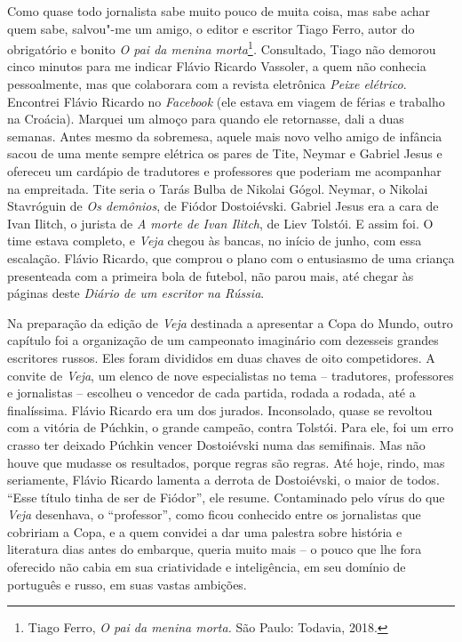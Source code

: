 Como quase todo jornalista sabe muito pouco de muita coisa, mas sabe
achar quem sabe, salvou"-me um amigo, o editor e escritor Tiago Ferro,
autor do obrigatório e bonito \emph{O pai da menina morta}\footnote{Tiago
  Ferro, \emph{O pai da menina morta.} São Paulo: Todavia, 2018.}\emph{.}
Consultado, Tiago não demorou cinco minutos para me indicar Flávio
Ricardo Vassoler, a quem não conhecia pessoalmente, mas que colaborara
com a revista eletrônica \emph{Peixe elétrico}. Encontrei Flávio Ricardo
no \emph{Facebook} (ele estava em viagem de férias e trabalho na
Croácia). Marquei um almoço para quando ele retornasse, dali a duas
semanas. Antes mesmo da sobremesa, aquele mais novo velho amigo de
infância sacou de uma mente sempre elétrica os pares de Tite, Neymar e
Gabriel Jesus e ofereceu um cardápio de tradutores e professores que
poderiam me acompanhar na empreitada. Tite seria o Tarás Bulba de
Nikolai Gógol. Neymar, o Nikolai Stavróguin de \emph{Os demônios}, de
Fiódor Dostoiévski. Gabriel Jesus era a cara de Ivan Ilitch, o jurista
de \emph{A morte de Ivan Ilitch}, de Liev Tolstói. E assim foi. O time
estava completo, e \emph{Veja} chegou às bancas, no início de junho, com
essa escalação. Flávio Ricardo, que comprou o plano com o entusiasmo de
uma criança presenteada com a primeira bola de futebol, não parou mais,
até chegar às páginas deste \emph{Diário de um escritor na Rússia}.

Na preparação da edição de \emph{Veja} destinada a apresentar a Copa do
Mundo, outro capítulo foi a organização de um campeonato imaginário com
dezesseis grandes escritores russos. Eles foram divididos em duas chaves
de oito competidores. A convite de \emph{Veja}, um elenco de nove
especialistas no tema -- tradutores, professores e jornalistas --
escolheu o vencedor de cada partida, rodada a rodada, até a finalíssima.
Flávio Ricardo era um dos jurados. Inconsolado, quase se revoltou com a
vitória de Púchkin, o grande campeão, contra Tolstói. Para ele, foi um
erro crasso ter deixado Púchkin vencer Dostoiévski numa das semifinais.
Mas não houve  que mudasse os resultados, porque regras são regras.
Até hoje, rindo, mas seriamente, Flávio Ricardo lamenta a derrota de
Dostoiévski, o maior de todos. ``Esse título tinha de ser de Fiódor'',
ele resume. Contaminado pelo vírus do que \emph{Veja} desenhava, o
``professor'', como ficou conhecido entre os jornalistas que cobririam a
Copa, e a quem convidei a dar uma palestra sobre história e literatura
dias antes do embarque, queria muito mais -- o pouco que lhe fora
oferecido não cabia em sua criatividade e inteligência, em seu domínio
de português e russo, em suas vastas ambições.

